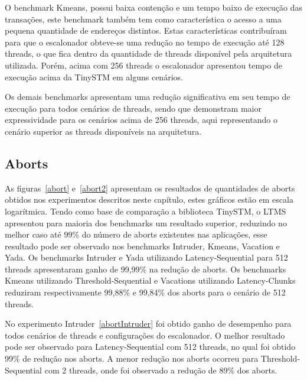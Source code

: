 \documentclass[diss,capa]{texufpel}
\begin{document}
O benchmark Kmeans, possui baixa contenção e um tempo baixo de execução das transações, este benchmark também tem como característica o acesso a uma pequena quantidade de endereços distintos. Estas características contribuíram para que o escalonador obteve-se uma redução no tempo de execução até 128 threads, o que fica dentro da quantidade de threads disponível pela arquitetura utilizada. Porém, acima com 256 threads o escalonador apresentou tempo de execução acima da TinySTM em alguns cenários.

Os demais benchmarks apresentam uma redução significativa em seu tempo de execução para todos cenários de threads, sendo que demonstram maior expressividade para os cenários acima de 256 threads, aqui representando o cenário superior as threads disponíveis na arquitetura.




\subsection{Aborts}

As figuras~\ref{abort} e~\ref{abort2} apresentam os resultados de quantidades de aborts obtidos nos experimentos descritos neste capítulo, estes gráficos estão em escala logarítmica. Tendo como base de comparação a biblioteca TinySTM, o LTMS apresentou para maioria dos benchmarks um resultado superior, reduzindo no melhor caso até 99\% do número de aborts existentes nas aplicações, esse resultado pode ser observado nos benchmarks Intruder, Kmeans, Vacation e Yada. Os benchmarks Intruder e Yada utilizando Latency-Sequential para 512 threads apresentaram ganho de 99,99\% na redução de aborts. Os benchmarks Kmeans utilizando Threshold-Sequential e Vacations utilizando Latency-Chunks reduziram respectivamente 99,88\% e 99,84\% dos aborts para o cenário de 512 threads.


No experimento Intruder~\ref{abortIntruder} foi obtido ganho de desempenho para todos cenários de threads e configurações do escalonador. O melhor resultado pode ser observado para Latency-Sequential com 512 threads, no qual foi obtido 99\% de redução nos aborts. A menor redução nos aborts ocorreu para Threshold-Sequential com 2 threads, onde foi observado a redução de 89\% dos aborts.
\end{document}

